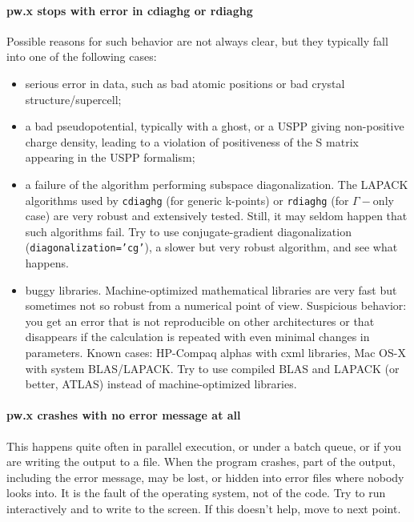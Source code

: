 \documentclass[12pt,a4paper]{article}
\begin{document}
\paragraph{pw.x stops with error in cdiaghg or rdiaghg}
Possible reasons for such behavior are not always clear, but they
typically fall into one of the following cases:
\begin{itemize}
\item serious error in data, such as bad atomic positions or bad
  crystal structure/supercell; 
\item a bad pseudopotential, typically with a ghost, or a USPP giving
  non-positive charge density, leading to a violation of positiveness
  of the S matrix appearing in the USPP formalism;  
\item a failure of the algorithm performing subspace
  diagonalization. The LAPACK algorithms used by \texttt{cdiaghg}
  (for generic k-points) or \texttt{rdiaghg} (for $\Gamma-$only case)
  are
  very robust and extensively tested. Still, it may seldom happen that
  such algorithms fail. Try to use conjugate-gradient diagonalization
  (\texttt{diagonalization='cg'}), a slower but very robust algorithm, and see
  what happens. 
\item buggy libraries. Machine-optimized mathematical libraries are
  very fast but sometimes not so robust from a numerical point of
  view.  Suspicious behavior: you get an error that is not
  reproducible on other architectures or that disappears if the
  calculation is repeated with even minimal changes in
  parameters. Known cases: HP-Compaq alphas with cxml libraries, Mac
  OS-X with system BLAS/LAPACK. Try to use compiled BLAS and LAPACK
  (or better, ATLAS) instead of machine-optimized libraries. 
\end{itemize}

\paragraph{pw.x crashes with no error message at all}
This happens quite often in parallel execution, or under a batch
queue, or if you are writing the output to a file. When the program
crashes, part of the output, including the error message, may be lost,
or hidden into error files where nobody looks into. It is the fault of
the operating system, not of the code. Try to run interactively 
and to write to the screen. If this doesn't help, move to next point.
\end{document}
